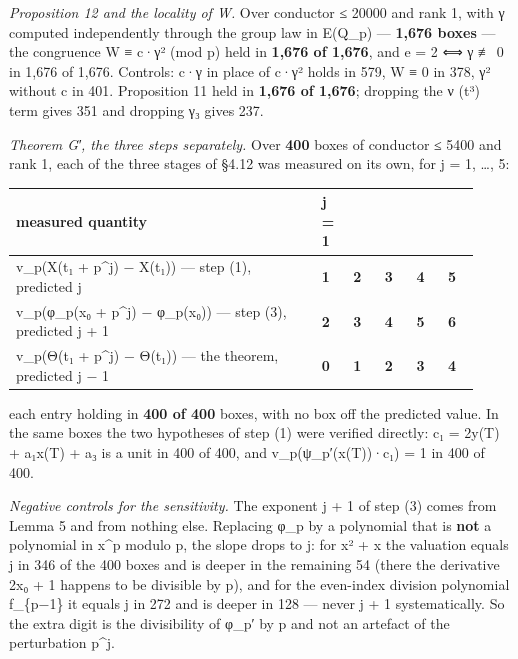 \documentclass[11pt,a4paper]{article}
\theoremstyle{named}
\begin{document}
\textit{Proposition 12 and the locality of W.} Over conductor ≤ 20000 and rank 1, with γ computed independently through the group law in E(Q\_p) — \textbf{1,676 boxes} — the congruence W ≡ c·γ² (mod p) held in \textbf{1,676 of 1,676}, and e = 2 ⟺ γ ≢ 0 in 1,676 of 1,676. Controls: c·γ in place of c·γ² holds in 579, W ≡ 0 in 378, γ² without c in 401. Proposition 11 held in \textbf{1,676 of 1,676}; dropping the ν (t³) term gives 351 and dropping γ₃ gives 237.

\textit{Theorem G′, the three steps separately.} Over \textbf{400} boxes of conductor ≤ 5400 and rank 1, each of the three stages of §4.12 was measured on its own, for j = 1, …, 5:

\begin{center}\begin{small}
\begin{tabular}{>{\raggedright\arraybackslash}p{0.588\linewidth}>{\raggedright\arraybackslash}p{0.066\linewidth}>{\raggedright\arraybackslash}p{0.066\linewidth}>{\raggedright\arraybackslash}p{0.066\linewidth}>{\raggedright\arraybackslash}p{0.066\linewidth}>{\raggedright\arraybackslash}p{0.066\linewidth}}
\hline
measured quantity & j = 1 & 2 & 3 & 4 & 5 \\
\hline
v\_p(X(t₁ + p\textasciicircum{}j) − X(t₁)) — step (1), predicted j & \textbf{1} & \textbf{2} & \textbf{3} & \textbf{4} & \textbf{5} \\
v\_p(φ\_p(x₀ + p\textasciicircum{}j) − φ\_p(x₀)) — step (3), predicted j + 1 & \textbf{2} & \textbf{3} & \textbf{4} & \textbf{5} & \textbf{6} \\
v\_p(Θ(t₁ + p\textasciicircum{}j) − Θ(t₁)) — the theorem, predicted j − 1 & \textbf{0} & \textbf{1} & \textbf{2} & \textbf{3} & \textbf{4} \\
\hline
\end{tabular}
\end{small}\end{center}

each entry holding in \textbf{400 of 400} boxes, with no box off the predicted value. In the same boxes the two hypotheses of step (1) were verified directly: c₁ = 2y(T) + a₁x(T) + a₃ is a unit in 400 of 400, and v\_p(ψ\_p′(x(T))·c₁) = 1 in 400 of 400.

\textit{Negative controls for the sensitivity.} The exponent j + 1 of step (3) comes from Lemma 5 and from nothing else. Replacing φ\_p by a polynomial that is \textbf{not} a polynomial in x\textasciicircum{}p modulo p, the slope drops to j: for x² + x the valuation equals j in 346 of the 400 boxes and is deeper in the remaining 54 (there the derivative 2x₀ + 1 happens to be divisible by p), and for the even-index division polynomial f\_\{p−1\} it equals j in 272 and is deeper in 128 — never j + 1 systematically. So the extra digit is the divisibility of φ\_p′ by p and not an artefact of the perturbation p\textasciicircum{}j.
\end{document}
